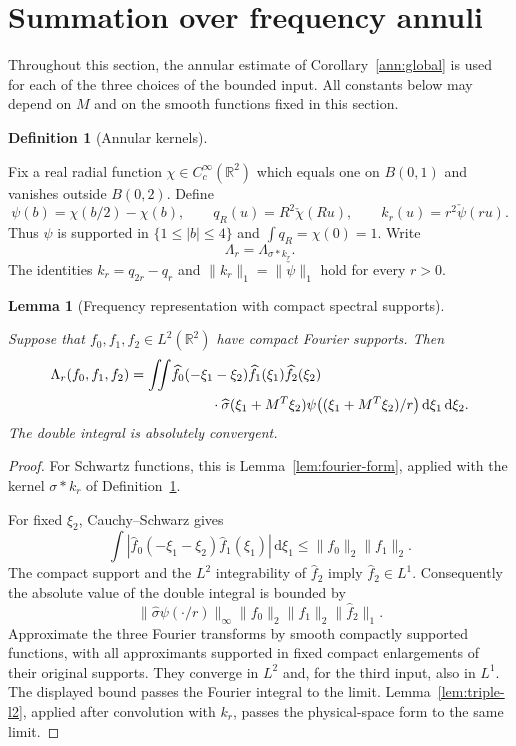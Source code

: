 \documentclass[11pt]{amsart}
\newcommand{\R}{\mathbb R}
\newcommand{\dd}{\,\mathrm d}
\newtheorem{lemma}[theorem]{Lemma}
\theoremstyle{definition}
\newtheorem{definition}[theorem]{Definition}
\theoremstyle{remark}
\numberwithin{equation}{section}
\providecommand{\lean}[1]{}
\providecommand{\leanok}{}
\begin{document}
\section{Summation over frequency annuli}\label{tail:section}

Throughout this section, the annular estimate of Corollary~\ref{ann:global}
is used for each of the three choices of the bounded input. All constants below
may depend on $M$ and on the smooth functions fixed in this section.

\begin{definition}[Annular kernels]\label{tail:annular-definition}
\lean{Auto.tailPsi,Auto.tailQ,Auto.tailK,Auto.tailForm,Auto.aux_tail_annular_definition}
Fix a real radial function $\chi\in C_c^\infty(\R^2)$ which equals one
on $B(0,1)$ and vanishes outside $B(0,2)$. Define
\[
 \psi(b)=\chi(b/2)-\chi(b),\qquad
 q_R(u)=R^2\check\chi(Ru),\qquad
 k_r(u)=r^2\check\psi(ru).
\]
Thus $\psi$ is supported in $\{1\le |b|\le4\}$ and
$\int q_R=\chi(0)=1$. Write
\[
 \Lambda_r=\Lambda_{\sigma*k_r}.
\]
The identities $k_r=q_{2r}-q_r$ and
$\|k_r\|_1=\|\check\psi\|_1$ hold for every $r>0$.
\end{definition}

\begin{lemma}[Frequency representation with compact spectral supports]
\label{tail:fourier}
\lean{Auto.tail_fourier}
\leanok
Suppose that $f_0,f_1,f_2\in L^2(\R^2)$ have compact Fourier supports.
Then
\begin{align*}
 \Lambda_r(f_0,f_1,f_2)
  =\iint &\widehat f_0(-\xi_1-\xi_2)
          \widehat f_1(\xi_1)\widehat f_2(\xi_2)\\
     &\hspace{10mm}\cdot\widehat\sigma(\xi_1+M^T\xi_2)
          \psi\big((\xi_1+M^T\xi_2)/r\big)
                \dd\xi_1\dd\xi_2.
\end{align*}
The double integral is absolutely convergent.
\end{lemma}
\begin{proof}
For Schwartz functions, this is Lemma~\ref{lem:fourier-form}, applied
with the kernel $\sigma*k_r$ of Definition~\ref{tail:annular-definition}.

For fixed $\xi_2$, Cauchy--Schwarz gives
\[
 \int |\widehat f_0(-\xi_1-\xi_2)\widehat f_1(\xi_1)|\dd\xi_1
 \le \|f_0\|_2\|f_1\|_2.
\]
The compact support and the $L^2$ integrability of $\widehat f_2$ imply
$\widehat f_2\in L^1$. Consequently the absolute value of the double
integral is bounded by
\[
 \|\widehat\sigma\psi(\cdot/r)\|_\infty
       \|f_0\|_2\|f_1\|_2\|\widehat f_2\|_1.
\]
Approximate the three Fourier transforms by smooth compactly supported
functions, with all approximants supported in fixed compact enlargements
of their original supports. They converge in $L^2$ and, for the third
input, also in $L^1$. The displayed bound passes the Fourier integral to
the limit. Lemma~\ref{lem:triple-l2}, applied after convolution with
$k_r$, passes the physical-space form to the same limit.
\end{proof}
\end{document}
